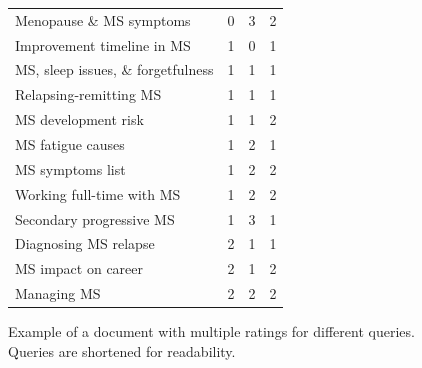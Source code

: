 \begin{figure}
\begin{minipage}{\textwidth}
\begin{tabularx}{\linewidth}{lXXX}
        Menopause \& MS symptoms                                                & 0            & 3             & 2             \\
        Improvement timeline in MS                                             & 1            & 0             & 1             \\
        MS, sleep issues, \& forgetfulness                                      & 1            & 1             & 1             \\
        Relapsing-remitting MS                                                 & 1            & 1             & 1             \\
        MS development risk                                                    & 1            & 1             & 2             \\
        MS fatigue causes                                                      & 1            & 2             & 1             \\
        MS symptoms list                                                       & 1            & 2             & 2             \\
        Working full-time with MS                                              & 1            & 2             & 2             \\
        Secondary progressive MS                                               & 1            & 3             & 1             \\
        Diagnosing MS relapse                                                  & 2            & 1             & 1             \\
        MS impact on career                                                    & 2            & 1             & 2             \\
        Managing MS                                                            & 2            & 2             & 2            
        \end{tabularx}
    \end{minipage}
    \caption{Example of a document with multiple ratings for different queries. Queries are shortened for readability.}
\end{figure}
\newpage